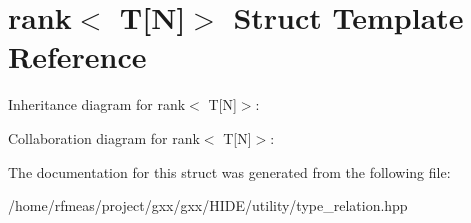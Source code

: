 \hypertarget{structrank_3_01T[N]_4}{}\section{rank$<$ T\mbox{[}N\mbox{]}$>$ Struct Template Reference}
\label{structrank_3_01T[N]_4}


Inheritance diagram for rank$<$ T\mbox{[}N\mbox{]}$>$\+:


Collaboration diagram for rank$<$ T\mbox{[}N\mbox{]}$>$\+:


The documentation for this struct was generated from the following file\+:\begin{DoxyCompactItemize}
\item 
/home/rfmeas/project/gxx/gxx/\+H\+I\+D\+E/utility/type\+\_\+relation.\+hpp\end{DoxyCompactItemize}
